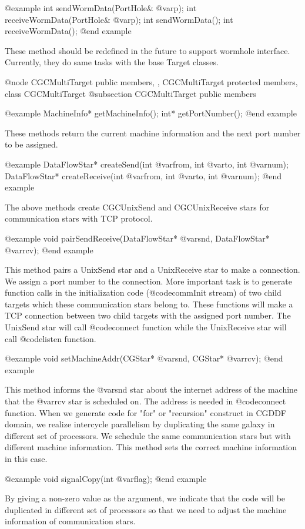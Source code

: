 {@example
int sendWormData(PortHole& @var{p});
int receiveWormData(PortHole& @var{p});
int sendWormData();
int receiveWormData();
@end example

These method should be redefined in the future to support
wormhole interface. Currently, they do same tasks with the base Target
classes.

@node CGCMultiTarget public members, , CGCMultiTarget protected members, class CGCMultiTarget
@subsection CGCMultiTarget public members

@example
MachineInfo* getMachineInfo();
int* getPortNumber();
@end example

These methods return the current machine information and the next port number
to be assigned.

@example
DataFlowStar* createSend(int @var{from}, int @var{to}, int @var{num});
DataFlowStar* createReceive(int @var{from}, int @var{to}, int @var{num});
@end example

The above methods create CGCUnixSend and CGCUnixReceive stars for
communication stars with TCP protocol.

@example
void pairSendReceive(DataFlowStar* @var{snd}, DataFlowStar* @var{rcv});
@end example

This method pairs a UnixSend star and a UnixReceive star to make a
connection. We assign a port number to the connection. More important
task is to generate function calls in the initialization code (@code{commInit}
stream) of two child targets which these communication stars belong to.
These functions will make a TCP connection between two child targets with
the assigned port number. The UnixSend star will call @code{connect}
function while the UnixReceive star will call @code{listen} function.

@example
void setMachineAddr(CGStar* @var{snd}, CGStar* @var{rcv});
@end example

This method informs the @var{snd} star about the internet address of 
the machine that the @var{rcv} star is scheduled on. The address is needed in
@code{connect} function. When we generate code for "for" or "recursion"
construct in CGDDF domain, we realize intercycle parallelism by
duplicating the same galaxy in different set of processors. We schedule
the same communication stars but with different machine information.
This method sets the correct machine information in this case.

@example
void signalCopy(int @var{flag});
@end example

By giving a non-zero value as the argument, we indicate that the code
will be duplicated in different set of processors so that we need to
adjust the machine information of communication stars.

}
